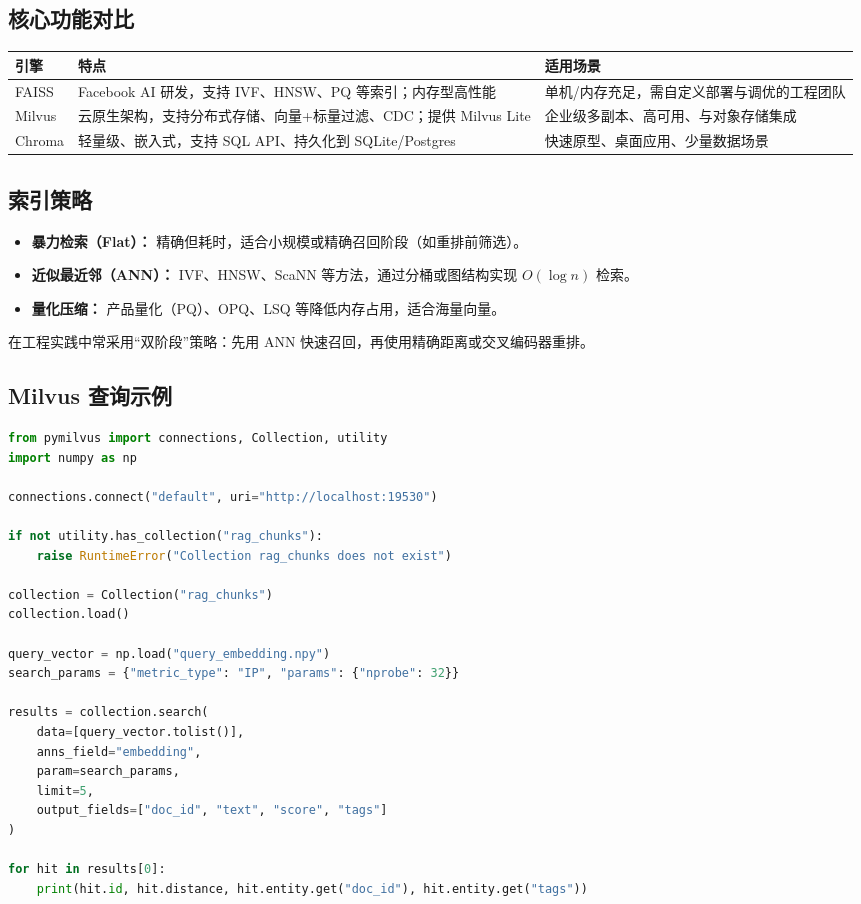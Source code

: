 \documentclass[UTF8,zihao=-4]{ctexart}
\begin{document}
\subsection{核心功能对比}
\begin{longtable}{p{3cm}p{4cm}p{6cm}}
\toprule
引擎 & 特点 & 适用场景 \\
\midrule
FAISS & Facebook AI 研发，支持 IVF、HNSW、PQ 等索引；内存型高性能 & 单机/内存充足，需自定义部署与调优的工程团队 \\
Milvus & 云原生架构，支持分布式存储、向量+标量过滤、CDC；提供 Milvus Lite & 企业级多副本、高可用、与对象存储集成 \\
Chroma & 轻量级、嵌入式，支持 SQL API、持久化到 SQLite/Postgres & 快速原型、桌面应用、少量数据场景 \\
\bottomrule
\end{longtable}

\subsection{索引策略}
\begin{itemize}
  \item \textbf{暴力检索（Flat）：} 精确但耗时，适合小规模或精确召回阶段（如重排前筛选）。
  \item \textbf{近似最近邻（ANN）：} IVF、HNSW、ScaNN 等方法，通过分桶或图结构实现 $O(\log n)$ 检索。
  \item \textbf{量化压缩：} 产品量化（PQ）、OPQ、LSQ 等降低内存占用，适合海量向量。
\end{itemize}
在工程实践中常采用“双阶段”策略：先用 ANN 快速召回，再使用精确距离或交叉编码器重排。

\subsection{Milvus 查询示例}
\begin{lstlisting}[language=Python,caption={在 Milvus 中执行向量检索}]
from pymilvus import connections, Collection, utility
import numpy as np

connections.connect("default", uri="http://localhost:19530")

if not utility.has_collection("rag_chunks"):
    raise RuntimeError("Collection rag_chunks does not exist")

collection = Collection("rag_chunks")
collection.load()

query_vector = np.load("query_embedding.npy")
search_params = {"metric_type": "IP", "params": {"nprobe": 32}}

results = collection.search(
    data=[query_vector.tolist()],
    anns_field="embedding",
    param=search_params,
    limit=5,
    output_fields=["doc_id", "text", "score", "tags"]
)

for hit in results[0]:
    print(hit.id, hit.distance, hit.entity.get("doc_id"), hit.entity.get("tags"))
\end{lstlisting}
\end{document}
